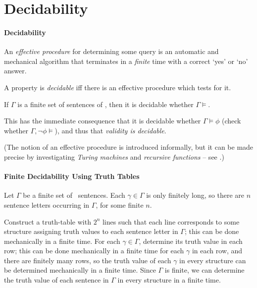 \section{Decidability}
\paragraph{Decidability}

An \emph{effective procedure} for determining some query is an automatic and mechanical algorithm that terminates in a \emph{finite} time with a correct `yes' or `no' answer. 

A property is \emph{decidable} iff there is an effective procedure which tests for it.

\begin{theorem}
	If $\Gamma$ is a finite set of sentences of \lone, then it is decidable whether $\Gamma \vDash$.
\end{theorem}

This has the immediate consequence that it is decidable whether $\Gamma\vDash\phi$ (check whether $\Gamma,\neg\phi\vDash$), and thus that \emph{validity is decidable}.

(The notion of an effective procedure is introduced informally, but it can be made precise by investigating \emph{Turing machines} and  \emph{recursive functions} – see \citet[chs.\ 1--8]{bbjcomlo}.)

\paragraph{Finite Decidability Using Truth Tables}

Let $\Gamma$ be a finite set of \lone\ sentences. Each $\gamma\in\Gamma$ is only finitely long, so there are $n$ sentence letters occurring in $\Gamma$, for some finite $n$.

Construct a truth-table with $2^{n}$ lines such that each line corresponds to some structure assigning truth values to each sentence letter in $\Gamma$; this can be done mechanically in a finite time. For each $\gamma \in \Gamma$, determine its truth value in each row; this can be done mechanically in a finite time for each $\gamma$ in each row, and there are finitely many rows, so the truth value of each $\gamma$ in every structure can be determined mechanically in a finite time. Since $\Gamma$ is finite, we can determine the truth value of each sentence in $\Gamma$ in every structure in a finite time. 

